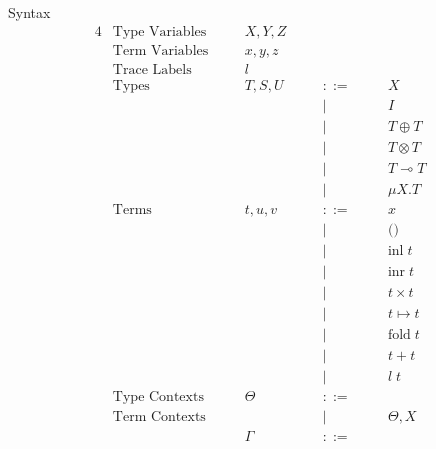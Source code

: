 \documentclass[10pt]{jsarticle}
\newcommand{\bnfdef}{::=}
\begin{document}
\begin{itembox}[c]{Syntax}
  \begin{alignat*}{4}
    &\text{Type Variables}  & \quad &X,Y,Z  & \quad &        & \quad & \\
    &\text{Term Variables}  &       &x,y,z  &       &        &       & \\
    &\text{Trace Labels}    &       &l      &       &        &       & \\
    &\text{Types}           &       &T,S,U  &       &\bnfdef &       & X \\
    &                       &       &       &       &|       &       & I \\
    &                       &       &       &       &|       &       & T \oplus T \\
    &                       &       &       &       &|       &       & T \otimes T \\
    &                       &       &       &       &|       &       & T \multimap T \\
    &                       &       &       &       &|       &       & \mu{X}.T \\
    &\text{Terms}           &       &t,u,v  &       &\bnfdef &       & x \\
    &                       &       &       &       &|       &       & \text{()} \\
    &                       &       &       &       &|       &       & \text{inl}\;t \\
    &                       &       &       &       &|       &       & \text{inr}\;t \\
    &                       &       &       &       &|       &       & t\times{}t \\
    &                       &       &       &       &|       &       & t\mapsto{}t \\
    &                       &       &       &       &|       &       & \text{fold}\;t \\
    &                       &       &       &       &|       &       & t+t \\
    &                       &       &       &       &|       &       & l\;t \\
    &\text{Type Contexts}   &       &\Theta &       &\bnfdef &       & \\
    &\text{Term Contexts}   &       &       &       &|       &       & \Theta,X \\
    &                       &       &\Gamma &       &\bnfdef &       & \\

\end{alignat*}
\end{itembox}
\end{document}
